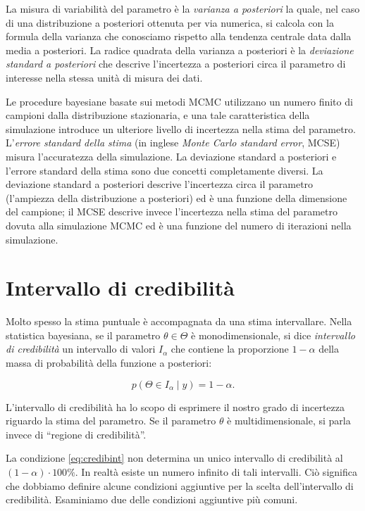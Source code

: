 \documentclass[
  11pt,
  italian,
  a4paper,
  extrafontsizes,onecolumn,openright
  ]{memoir}
\begin{document}
La misura di variabilità del parametro è la \emph{varianza a posteriori}
la quale, nel caso di una distribuzione a posteriori ottenuta per via
numerica, si calcola con la formula della varianza che conosciamo
rispetto alla tendenza centrale data dalla media a posteriori. La radice quadrata della varianza a posteriori è la \emph{deviazione standard a posteriori} che descrive l'incertezza a posteriori circa il parametro di interesse nella stessa unità di misura dei dati.

Le procedure bayesiane basate sui metodi MCMC utilizzano un numero finito di campioni dalla distribuzione stazionaria, e una tale caratteristica della simulazione introduce un ulteriore livello di incertezza nella stima del parametro. L'\emph{errore standard della stima} (in inglese \emph{Monte Carlo standard error}, MCSE) misura l'accuratezza della simulazione. La deviazione standard a posteriori e l'errore standard della stima sono due concetti completamente diversi. La deviazione standard a posteriori descrive l'incertezza circa il parametro (l'ampiezza della distribuzione a posteriori) ed è una funzione della dimensione del campione; il MCSE descrive invece l'incertezza nella stima del parametro dovuta alla simulazione MCMC ed è una funzione del numero di iterazioni nella simulazione.

\hypertarget{intervallo-di-credibilituxe0}{%
\section{Intervallo di credibilità}\label{intervallo-di-credibilituxe0}}

Molto spesso la stima puntuale è accompagnata da una stima intervallare. Nella statistica bayesiana, se il parametro \(\theta \in \Theta\) è monodimensionale, si dice \emph{intervallo di credibilità} un intervallo di valori \(I_{\alpha}\) che contiene la proporzione \(1 - \alpha\) della massa di probabilità della funzione a posteriori:

\begin{equation}
p(\Theta \in I_{\alpha} \mid y) = 1 - \alpha.
\label{eq:credibint}
\end{equation}

L'intervallo di credibilità ha lo scopo di esprimere il nostro grado di incertezza riguardo la stima del parametro. Se il parametro \(\theta\) è multidimensionale, si parla invece di ``regione di credibilità''.

La condizione \eqref{eq:credibint} non determina un unico intervallo di
credibilità al \((1 - \alpha) \cdot 100\%\). In realtà esiste un numero
infinito di tali intervalli. Ciò significa che dobbiamo definire alcune
condizioni aggiuntive per la scelta dell'intervallo di credibilità.
Esaminiamo due delle condizioni aggiuntive più comuni.
\end{document}
